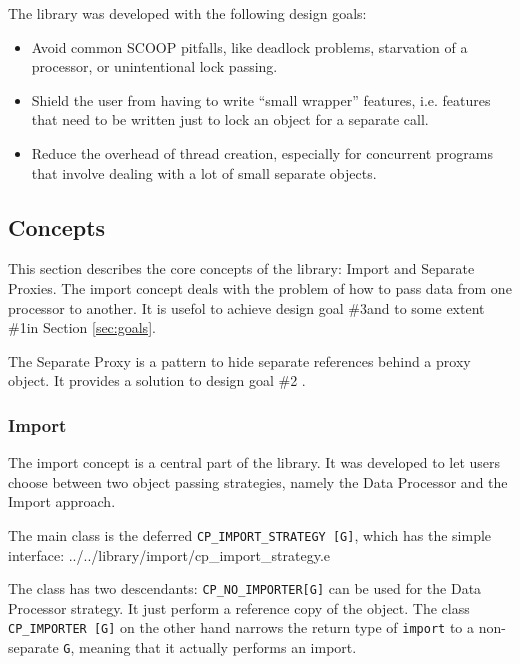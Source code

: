 \documentclass[a4paper,10pt]{article}
\newcommand{\todoref}{\todo{ref}}
\begin{document}
The library was developed with the following design goals:

\begin{itemize}
 \item Avoid common SCOOP pitfalls, like deadlock problems, starvation of a processor, or unintentional lock passing.
 \item Shield the user from having to write ``small wrapper'' features, i.e. features that need to be written just to lock an object for a separate call.
 \item Reduce the overhead of thread creation, especially for concurrent programs that involve dealing with a lot of small separate objects.
\end{itemize}

\subsection{Concepts}

This section describes the core concepts of the library: Import and Separate Proxies.
The import concept deals with the problem of how to pass data from one processor to another.
It is usefol to achieve design goal \#3\todoref and to some extent \#1\todoref in Section \ref{sec:goals}.

The Separate Proxy is a pattern to hide separate references behind a proxy object.
It provides a solution to design goal \#2 \todoref.

\subsubsection{Import}
\label{sec:concepts:import}

The import concept is a central part of the library.
It was developed to let users choose between two object passing strategies, namely the Data Processor \todoref and the Import \todoref approach.

The main class is the deferred \lstinline!CP_IMPORT_STRATEGY [G]!, which has the simple interface:
 {../../library/import/cp_import_strategy.e}

The class has two descendants: \lstinline!CP_NO_IMPORTER[G]! can be used for the Data Processor strategy. 
It just perform a reference copy of the object.
The class \lstinline!CP_IMPORTER [G]! on the other hand narrows the return type of \lstinline!import! to a non-separate \lstinline!G!, meaning that it actually performs an import.
\end{document}
